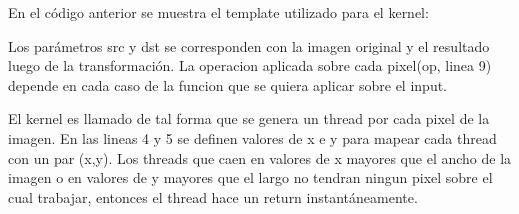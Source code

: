 \documentclass[a4paper,10pt]{report}
\begin{document}
En el código anterior se muestra el template utilizado para el kernel:

Los parámetros src y dst se corresponden con la imagen original y el resultado luego de la transformación.
La operacion aplicada sobre cada pixel(op, linea 9) depende en cada caso de la funcion que se quiera aplicar sobre el input.

El kernel es llamado de tal forma que se genera un thread por cada pixel de la imagen.
En las lineas 4 y 5 se definen valores de x e y para mapear cada thread con un par (x,y).
Los threads que caen en valores de x mayores que el ancho de la imagen o en valores de y mayores que el largo no tendran ningun pixel sobre el cual trabajar, entonces el thread hace un return instantáneamente.





% 
% 
% 
\end{document}
